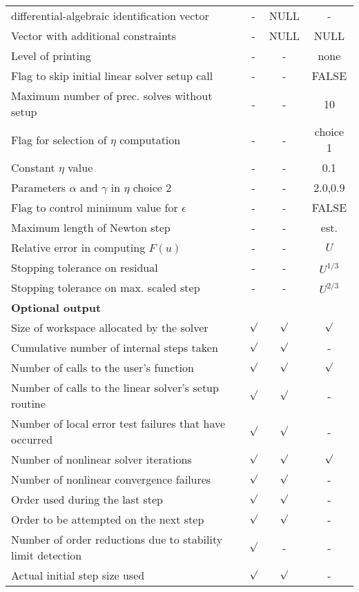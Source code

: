 \begin{table}[tp]
\begin{tabular}{|p{2.75in}|c|c|c|}
differential-algebraic identification vector & - & NULL & - \\
Vector with additional constraints & - & NULL & NULL \\
Level of printing & - & - & none \\
Flag to skip initial linear solver setup call & - & - & FALSE \\
Maximum number of prec. solves without setup & - & - & 10 \\
Flag for selection of $\eta$ computation & - & - & choice 1 \\
Constant $\eta$ value & - & - & 0.1 \\
Parameters $\alpha$ and $\gamma$ in $\eta$ choice 2 & - & - & $2.0$,$0.9$\\
Flag to control minimum value for $\epsilon$ & - & - & FALSE \\
Maximum length of Newton step & - & - & est. \\
Relative error in computing $F(u)$ & - & - & $U$ \\
Stopping tolerance on residual & - & - & $U^{1/3}$ \\
Stopping tolerance on max. scaled step & - & - & $U^{2/3}$ \\
\hline
\hline
{\bf Optional output} &  &  & \\
\hline
Size of workspace allocated by the solver & $\surd$ & $\surd$ & $\surd$ \\
Cumulative number of internal steps taken & $\surd$ & $\surd$ & - \\
Number of calls to the user's function & $\surd$ & $\surd$ & $\surd$ \\
Number of calls to the linear solver's setup routine & $\surd$ & $\surd$ & - \\
Number of local error test failures that have occurred & $\surd$ & $\surd$ & - \\
Number of nonlinear solver iterations & $\surd$ & $\surd$ & $\surd$ \\
Number of nonlinear convergence failures & $\surd$ & $\surd$ & - \\
Order used during the last step & $\surd$ & $\surd$ & - \\
Order to be attempted on the next step & $\surd$ & $\surd$ & - \\
Number of order reductions due to stability limit detection & $\surd$ & - & - \\
Actual initial step size used & $\surd$ & $\surd$ & - \\

\end{tabular}
\end{table}
